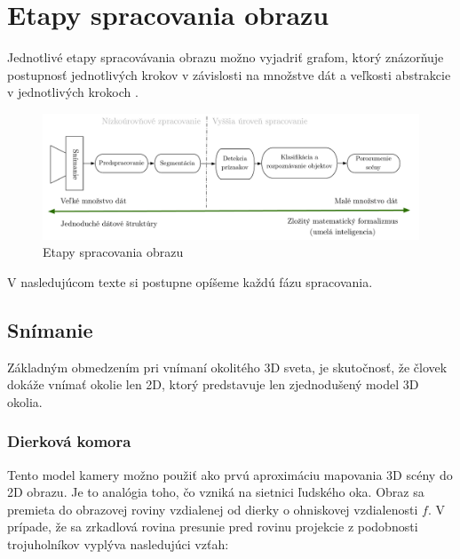 \section{Etapy spracovania obrazu}

Jednotlivé etapy spracovávania obrazu možno vyjadriť grafom, ktorý znázorňuje postupnosť jednotlivých krokov v závislosti na množstve dát a veľkosti abstrakcie v jednotlivých krokoch \cite{Analysis_and_Machine_Vision}. 

\begin{figure}[H]
\begin{center}
	\includegraphics[scale=0.45]{images/phaseCV}
	\caption{Etapy spracovania obrazu}
	\end{center}
\end{figure}

V nasledujúcom texte si postupne opíšeme každú fázu spracovania. 


\subsection{Snímanie}
Základným obmedzením pri vnímaní okolitého 3D sveta, je skutočnosť, že človek dokáže vnímať okolie len 2D, ktorý predstavuje len zjednodušený model 3D okolia.


\subsubsection{Dierková komora}Tento model kamery možno použiť ako prvú aproximáciu mapovania 3D scény do 2D obrazu. Je to analógia toho, čo vzniká na sietnici ľudského oka. \cite{Pin_hole_camera} Obraz sa premieta do obrazovej roviny vzdialenej od dierky o ohniskovej vzdialenosti $f$. V prípade, že sa zrkadlová rovina presunie pred rovinu projekcie z podobnosti trojuholníkov vyplýva nasledujúci vzťah:



